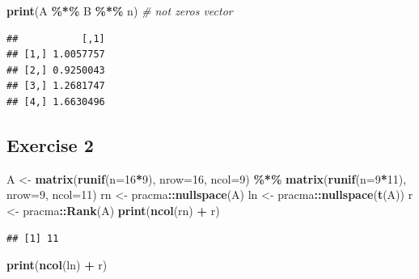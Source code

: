 \documentclass[
]{book}
\newenvironment{Shaded}{\begin{snugshade}}{\end{snugshade}}
\newcommand{\CommentTok}[1]{\textcolor[rgb]{0.56,0.35,0.01}{\textit{#1}}}
\newcommand{\DataTypeTok}[1]{\textcolor[rgb]{0.13,0.29,0.53}{#1}}
\newcommand{\DecValTok}[1]{\textcolor[rgb]{0.00,0.00,0.81}{#1}}
\newcommand{\KeywordTok}[1]{\textcolor[rgb]{0.13,0.29,0.53}{\textbf{#1}}}
\newcommand{\NormalTok}[1]{#1}
\newcommand{\OperatorTok}[1]{\textcolor[rgb]{0.81,0.36,0.00}{\textbf{#1}}}
\newcommand{\StringTok}[1]{\textcolor[rgb]{0.31,0.60,0.02}{#1}}
\begin{document}
\begin{Shaded}
\begin{Highlighting}[]
\KeywordTok{print}\NormalTok{(A }\OperatorTok{\%*\%}\StringTok{ }\NormalTok{B }\OperatorTok{\%*\%}\StringTok{ }\NormalTok{n) }\CommentTok{\# not zeros vector}
\end{Highlighting}
\end{Shaded}

\begin{verbatim}
##           [,1]
## [1,] 1.0057757
## [2,] 0.9250043
## [3,] 1.2681747
## [4,] 1.6630496
\end{verbatim}

\hypertarget{exercise-2-4}{%
\subsection*{Exercise 2}\label{exercise-2-4}}

\begin{Shaded}
\begin{Highlighting}[]
\NormalTok{A \textless{}{-}}\StringTok{ }\KeywordTok{matrix}\NormalTok{(}\KeywordTok{runif}\NormalTok{(}\DataTypeTok{n=}\DecValTok{16}\OperatorTok{*}\DecValTok{9}\NormalTok{), }\DataTypeTok{nrow=}\DecValTok{16}\NormalTok{, }\DataTypeTok{ncol=}\DecValTok{9}\NormalTok{) }\OperatorTok{\%*\%}\StringTok{ }\KeywordTok{matrix}\NormalTok{(}\KeywordTok{runif}\NormalTok{(}\DataTypeTok{n=}\DecValTok{9}\OperatorTok{*}\DecValTok{11}\NormalTok{), }\DataTypeTok{nrow=}\DecValTok{9}\NormalTok{, }\DataTypeTok{ncol=}\DecValTok{11}\NormalTok{)}
\NormalTok{rn \textless{}{-}}\StringTok{ }\NormalTok{pracma}\OperatorTok{::}\KeywordTok{nullspace}\NormalTok{(A)}
\NormalTok{ln \textless{}{-}}\StringTok{ }\NormalTok{pracma}\OperatorTok{::}\KeywordTok{nullspace}\NormalTok{(}\KeywordTok{t}\NormalTok{(A))}
\NormalTok{r \textless{}{-}}\StringTok{ }\NormalTok{pracma}\OperatorTok{::}\KeywordTok{Rank}\NormalTok{(A)}
\KeywordTok{print}\NormalTok{(}\KeywordTok{ncol}\NormalTok{(rn) }\OperatorTok{+}\StringTok{ }\NormalTok{r)}
\end{Highlighting}
\end{Shaded}

\begin{verbatim}
## [1] 11
\end{verbatim}

\begin{Shaded}
\begin{Highlighting}[]
\KeywordTok{print}\NormalTok{(}\KeywordTok{ncol}\NormalTok{(ln) }\OperatorTok{+}\StringTok{ }\NormalTok{r)}
\end{Highlighting}
\end{Shaded}
\end{document}
